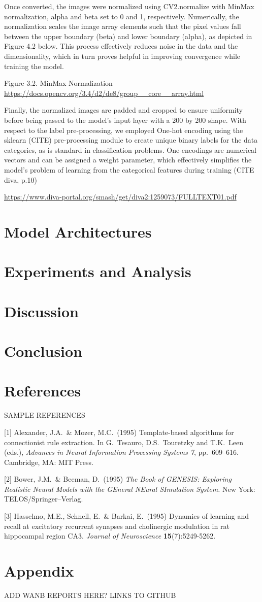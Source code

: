 \documentclass{article}
\begin{document}
Once converted, the images were normalized using CV2.normalize with MinMax normalization, alpha and beta set to 0 and 1, respectively. Numerically, the normalization scales the image array elements such that the pixel values fall between the upper boundary (beta) and lower boundary (alpha), as depicted in Figure 4.2 below. This process effectively reduces noise in the data and the dimensionality, which in turn proves helpful in improving convergence while training the model.

Figure 3.2. MinMax Normalization 
\url{https://docs.opencv.org/3.4/d2/de8/group__core__array.html}

Finally, the normalized images are padded and cropped to ensure uniformity before being passed to the model's input layer with a 200 by 200 shape. With respect to the label pre-processing, we employed One-hot encoding using the sklearn (CITE) pre-processing module to create unique binary labels for the data categories, as is standard in classification problems. One-encodings are numerical vectors and can be assigned a weight parameter, which effectively simplifies the model's problem of learning from the categorical features during training (CITE diva, p.10) 

\url{https://www.diva-portal.org/smash/get/diva2:1259073/FULLTEXT01.pdf}


\section{Model Architectures}
\section{Experiments and Analysis}
\section{Discussion}
\section{Conclusion}
\section*{References}

\medskip

{
\small

SAMPLE REFERENCES

[1] Alexander, J.A.\ \& Mozer, M.C.\ (1995) Template-based algorithms for
connectionist rule extraction. In G.\ Tesauro, D.S.\ Touretzky and T.K.\ Leen
(eds.), {\it Advances in Neural Information Processing Systems 7},
pp.\ 609--616. Cambridge, MA: MIT Press.

[2] Bower, J.M.\ \& Beeman, D.\ (1995) {\it The Book of GENESIS: Exploring
  Realistic Neural Models with the GEneral NEural SImulation System.}  New York:
TELOS/Springer--Verlag.

[3] Hasselmo, M.E., Schnell, E.\ \& Barkai, E.\ (1995) Dynamics of learning and
recall at excitatory recurrent synapses and cholinergic modulation in rat
hippocampal region CA3. {\it Journal of Neuroscience} {\bf 15}(7):5249-5262.
}


\appendix

\section{Appendix}

ADD WANB REPORTS HERE? LINKS TO GITHUB
\end{document}
